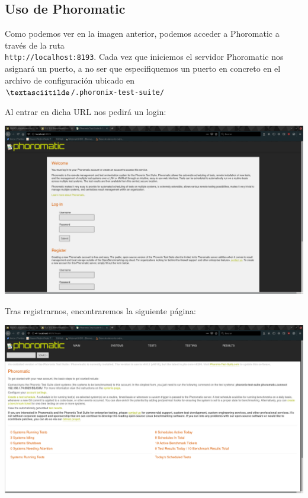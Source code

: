 \documentclass[12pt, spanish]{article}
\begin{document}
\subsection{Uso de Phoromatic}

Como podemos ver en la imagen anterior, podemos acceder a Phoromatic a través de la ruta\\ \texttt{http://localhost:8193}. Cada vez que iniciemos el servidor Phoromatic nos asignará un puerto, a no ser que especifiquemos un puerto en concreto en el archivo de configuración ubicado en\\ \texttt{$\textasciitilde$/.phoronix-test-suite/}

Al entrar en dicha URL nos pedirá un login:

\begin{center}
\includegraphics[scale=0.25]{login_phoromatic.png}
\end{center}

Tras registrarnos, encontraremos la siguiente página:

\begin{center}
\includegraphics[scale=0.25]{main_phoromatic.png}
\end{center}
\end{document}

